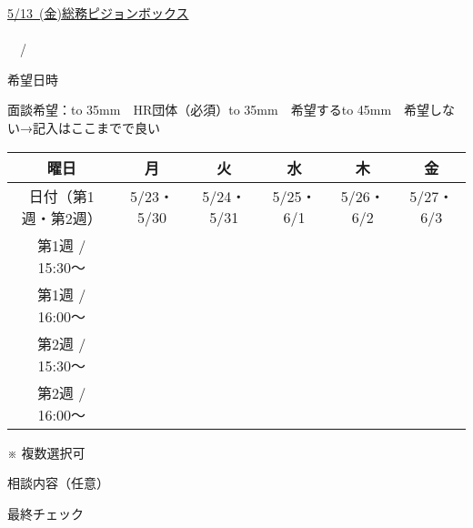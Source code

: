 \documentclass[paper=b5j, fleqn, jafontsize=9pt, jafontscale=1, head_space=25.5mm, foot_space=15mm, fore-edge=9.5mm, gutter=9.5mm, hanging_punctuation, baselineskip=7mm]{jlreq}
\begin{document}
\pagestyle{normals}
\begin{center}
    {\selectsize{15pt}{15pt}}
    \vskip5mm
\end{center}
\uline{{\selectsize{10pt}{10pt}\uline{5/13~({\selectsize{9pt}{9pt}金})}}}\uline{総務ピジョンボックス}\\
\uline{\hspace{70mm}}\hspace{2.5\zw} \\
\uline{\hspace{55mm}}~~/~~\uline{\hspace{55mm}} \\


\begin{question}{希望日時}
\end{question}
\begin{answer}
\noindent 面談希望：\hbox to 35mm{~~HR団体（必須）\hfill}\hbox to 35mm{~~希望する\hfill}\hbox to 45mm{~~希望しない→記入はここまでで良い\hfill}\\
\begin{table}[H]
    \centering
        \begin{tabularx}{150mm}{|c|C|C|C|C|C|}\hline
            曜日     & 月         & 火         & 水        & 木        & 金        \\\hline
            日付（第1週・第2週）     & 5/23・5/30 & 5/24・5/31 & 5/25・6/1 & 5/26・6/2 & 5/27・6/3 \\\hline
            第1週 / 15:30〜 & \egg{~} & \egg{~} & \egg{~} & \egg{~} & \egg{~} \\\hline
            第1週 / 16:00〜 & \egg{~} & \egg{~} & \egg{~} & \egg{~} & \egg{~} \\\hline
            第2週 / 15:30〜 & \egg{~} & \egg{~} & \egg{~} & \egg{~} & \egg{~} \\\hline
            第2週 / 16:00〜 & \egg{~} & \egg{~} & \egg{~} & \egg{~} & \egg{~} \\\hline
        \end{tabularx}
\end{table}
\vspace{-4mm}
\begin{flushright}
※ 複数選択可
\end{flushright}
\end{answer}

\begin{question}{相談内容（任意）}

\end{question}
\begin{answer}
\writebox[height=30mm]{}

\end{answer}

\vspace{8mm}
\begin{flushright}
    \vskip0.2mm
    最終チェック~\scoringbox{}
\end{flushright}
\vfill
\end{document}
